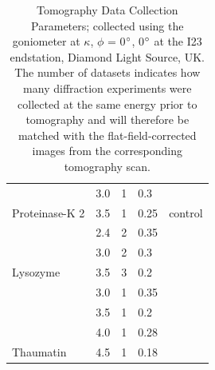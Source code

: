 \begin{table}[h]
{\begin{tabular}{@{}lllll@{}}
                                 & 3.0    & 1             & 0.3                           &                                \\
\multirow{-2}{*}{Proteinase-K 2} & 3.5    & 1             & 0.25                          & \multirow{-2}{*}{control}      \\
                                 & 2.4    & 2             & 0.35                          &                                \\
                                 & 3.0    & 2             & 0.3                           &                                \\
\multirow{-3}{*}{Lysozyme}       & 3.5    & 3             & 0.2                           &                                \\
                                 & 3.0    & 1             & 0.35                          &                                \\
                                 & 3.5    & 1             & 0.2                           &                                \\
                                 & 4.0    & 1             & 0.28                          &                                \\
\multirow{-4}{*}{Thaumatin}      & 4.5    & 1             & 0.18                          &       \\
\bottomrule
\end{tabular}%
}

\caption{Tomography Data Collection Parameters; collected using the goniometer at $\kappa$, $\phi$ = 0$\degree$, 0$\degree$ at the I23 endstation, Diamond Light Source, UK. The number of datasets indicates how many diffraction experiments were collected at the same energy prior to tomography and will therefore be matched with the flat-field-corrected images from the corresponding tomography scan.}
\label{tomo_table}
\end{table}

